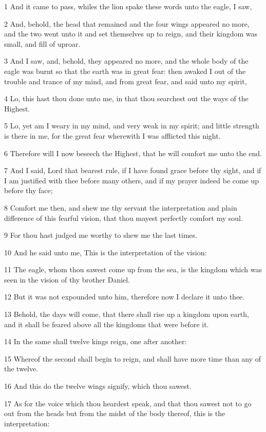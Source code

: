 \par 1 And it came to pass, whiles the lion spake these words unto the eagle, I saw,
\par 2 And, behold, the head that remained and the four wings appeared no more, and the two went unto it and set themselves up to reign, and their kingdom was small, and fill of uproar.
\par 3 And I saw, and, behold, they appeared no more, and the whole body of the eagle was burnt so that the earth was in great fear: then awaked I out of the trouble and trance of my mind, and from great fear, and said unto my spirit,
\par 4 Lo, this hast thou done unto me, in that thou searchest out the ways of the Highest.
\par 5 Lo, yet am I weary in my mind, and very weak in my spirit; and little strength is there in me, for the great fear wherewith I was afflicted this night.
\par 6 Therefore will I now beseech the Highest, that he will comfort me unto the end.
\par 7 And I said, Lord that bearest rule, if I have found grace before thy sight, and if I am justified with thee before many others, and if my prayer indeed be come up before thy face;
\par 8 Comfort me then, and shew me thy servant the interpretation and plain difference of this fearful vision, that thou mayest perfectly comfort my soul.
\par 9 For thou hast judged me worthy to shew me the last times.
\par 10 And he said unto me, This is the interpretation of the vision:
\par 11 The eagle, whom thou sawest come up from the sea, is the kingdom which was seen in the vision of thy brother Daniel.
\par 12 But it was not expounded unto him, therefore now I declare it unto thee.
\par 13 Behold, the days will come, that there shall rise up a kingdom upon earth, and it shall be feared above all the kingdoms that were before it.
\par 14 In the same shall twelve kings reign, one after another:
\par 15 Whereof the second shall begin to reign, and shall have more time than any of the twelve.
\par 16 And this do the twelve wings signify, which thou sawest.
\par 17 As for the voice which thou heardest speak, and that thou sawest not to go out from the heads but from the midst of the body thereof, this is the interpretation:
